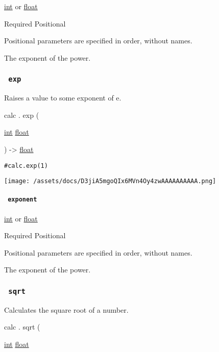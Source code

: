 \href{/docs/reference/foundations/int/}{int} {or}
\href{/docs/reference/foundations/float/}{float}

{Required} {{ Positional }}

\label{functions-pow-exponent-positional-tooltip}
Positional parameters are specified in order, without names.

The exponent of the power.

\subsubsection{\texorpdfstring{\texttt{\ exp\ }}{ exp }}\label{functions-exp}

Raises a value to some exponent of e.

calc { . } { exp } (

{ \href{/docs/reference/foundations/int/}{int}
\href{/docs/reference/foundations/float/}{float} }

) -\textgreater{} \href{/docs/reference/foundations/float/}{float}

\begin{verbatim}
#calc.exp(1)
\end{verbatim}

\texttt{[image: /assets/docs/D3jiA5mgoQIx6MVn4Oy4zwAAAAAAAAAA.png]}

\paragraph{\texorpdfstring{\texttt{\ exponent\ }}{ exponent }}\label{functions-exp-exponent}

\href{/docs/reference/foundations/int/}{int} {or}
\href{/docs/reference/foundations/float/}{float}

{Required} {{ Positional }}

\label{functions-exp-exponent-positional-tooltip}
Positional parameters are specified in order, without names.

The exponent of the power.

\subsubsection{\texorpdfstring{\texttt{\ sqrt\ }}{ sqrt }}\label{functions-sqrt}

Calculates the square root of a number.

calc { . } { sqrt } (

{ \href{/docs/reference/foundations/int/}{int}
\href{/docs/reference/foundations/float/}{float} }

